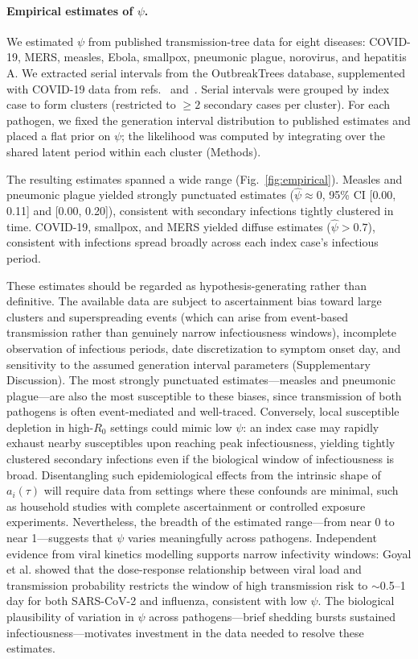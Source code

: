 \paragraph{Empirical estimates of $\psi$.}
We estimated $\psi$ from published transmission-tree data for eight diseases: COVID-19, MERS, measles, Ebola, smallpox, pneumonic plague, norovirus, and hepatitis A. We extracted serial intervals from the OutbreakTrees database\citep{taube_outbreaktrees_2022}, supplemented with COVID-19 data from refs.~ and~. Serial intervals were grouped by index case to form clusters (restricted to $\geq 2$ secondary cases per cluster). For each pathogen, we fixed the generation interval distribution to published estimates and placed a flat prior on $\psi$; the likelihood was computed by integrating over the shared latent period within each cluster (Methods).

The resulting estimates spanned a wide range (Fig.~\ref{fig:empirical}). Measles and pneumonic plague yielded strongly punctuated estimates ($\hat{\psi} \approx 0$, 95\% CI [0.00, 0.11] and [0.00, 0.20]), consistent with secondary infections tightly clustered in time. COVID-19, smallpox, and MERS yielded diffuse estimates ($\hat{\psi} > 0.7$), consistent with infections spread broadly across each index case's infectious period.

These estimates should be regarded as hypothesis-generating rather than definitive. The available data are subject to ascertainment bias toward large clusters and superspreading events (which can arise from event-based transmission rather than genuinely narrow infectiousness windows), incomplete observation of infectious periods, date discretization to symptom onset day, and sensitivity to the assumed generation interval parameters (Supplementary Discussion). The most strongly punctuated estimates---measles and pneumonic plague---are also the most susceptible to these biases, since transmission of both pathogens is often event-mediated and well-traced. Conversely, local susceptible depletion in high-$R_0$ settings could mimic low $\psi$: an index case may rapidly exhaust nearby susceptibles upon reaching peak infectiousness, yielding tightly clustered secondary infections even if the biological window of infectiousness is broad. Disentangling such epidemiological effects from the intrinsic shape of $a_i(\tau)$ will require data from settings where these confounds are minimal, such as household studies with complete ascertainment or controlled exposure experiments. Nevertheless, the breadth of the estimated range---from near 0 to near 1---suggests that $\psi$ varies meaningfully across pathogens. Independent evidence from viral kinetics modelling supports narrow infectivity windows: Goyal et al.\citep{goyal_viral_2021} showed that the dose-response relationship between viral load and transmission probability restricts the window of high transmission risk to $\sim$0.5--1 day for both SARS-CoV-2 and influenza, consistent with low $\psi$. The biological plausibility of variation in $\psi$ across pathogens---brief shedding bursts \vs sustained infectiousness---motivates investment in the data needed to resolve these estimates.

